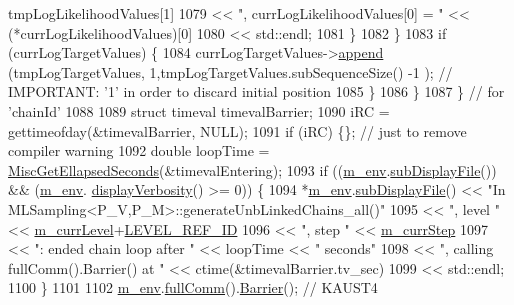 \begin{DoxyCode}
      tmpLogLikelihoodValues[1]
1079                                   << \textcolor{stringliteral}{", currLogLikelihoodValues[0] = "}               << 
      (*currLogLikelihoodValues)[0]
1080                                   << std::endl;
1081         \}
1082       \}
1083       \textcolor{keywordflow}{if} (currLogTargetValues) \{
1084         currLogTargetValues->\hyperlink{class_q_u_e_s_o_1_1_scalar_sequence_a75cdd556cc417e35a6b9f7aff86896ae}{append}    (tmpLogTargetValues,    1,tmpLogTargetValues.subSequenceSize()
      -1    ); \textcolor{comment}{// IMPORTANT: '1' in order to discard initial position}
1085       \}
1086     \}
1087   \} \textcolor{comment}{// for 'chainId'}
1088 
1089   \textcolor{keyword}{struct }timeval timevalBarrier;
1090   iRC = gettimeofday(&timevalBarrier, NULL);
1091   \textcolor{keywordflow}{if} (iRC) \{\}; \textcolor{comment}{// just to remove compiler warning}
1092   \textcolor{keywordtype}{double} loopTime = \hyperlink{namespace_q_u_e_s_o_a424bc33f2e6e287fd468408d14b772ee}{MiscGetEllapsedSeconds}(&timevalEntering);
1093   \textcolor{keywordflow}{if} ((\hyperlink{class_q_u_e_s_o_1_1_m_l_sampling_a13f1ca4fe9f94822fe572a743eaced1d}{m\_env}.\hyperlink{class_q_u_e_s_o_1_1_base_environment_a8a0064746ae8dddfece4229b9ad374d6}{subDisplayFile}()) && (\hyperlink{class_q_u_e_s_o_1_1_m_l_sampling_a13f1ca4fe9f94822fe572a743eaced1d}{m\_env}.
      \hyperlink{class_q_u_e_s_o_1_1_base_environment_a1fe5f244fc0316a0ab3e37463f108b96}{displayVerbosity}() >= 0)) \{
1094     *\hyperlink{class_q_u_e_s_o_1_1_m_l_sampling_a13f1ca4fe9f94822fe572a743eaced1d}{m\_env}.\hyperlink{class_q_u_e_s_o_1_1_base_environment_a8a0064746ae8dddfece4229b9ad374d6}{subDisplayFile}() << \textcolor{stringliteral}{"In MLSampling<P\_V,P\_M>::generateUnbLinkedChains\_all()"}
1095                             << \textcolor{stringliteral}{", level "} << \hyperlink{class_q_u_e_s_o_1_1_m_l_sampling_af9416874c856e50f3b35270e801f17e4}{m\_currLevel}+\hyperlink{_m_l_sampling_level_options_8h_a68d15eaf394d210effcf584b938206d3}{LEVEL\_REF\_ID}
1096                             << \textcolor{stringliteral}{", step "}  << \hyperlink{class_q_u_e_s_o_1_1_m_l_sampling_a1b1f8ccb4823bdfa26ec652f0807c63e}{m\_currStep}
1097                             << \textcolor{stringliteral}{": ended chain loop after "} << loopTime << \textcolor{stringliteral}{" seconds"}
1098                             << \textcolor{stringliteral}{", calling fullComm().Barrier() at "} << ctime(&timevalBarrier.tv\_sec)
1099                             << std::endl;
1100   \}
1101 
1102   \hyperlink{class_q_u_e_s_o_1_1_m_l_sampling_a13f1ca4fe9f94822fe572a743eaced1d}{m\_env}.\hyperlink{class_q_u_e_s_o_1_1_base_environment_a0b0779b41ff304058856e97e1d16b4d4}{fullComm}().\hyperlink{class_q_u_e_s_o_1_1_mpi_comm_a4059971c30e023b272fccaa6aa00c426}{Barrier}(); \textcolor{comment}{// KAUST4}

\end{DoxyCode}
